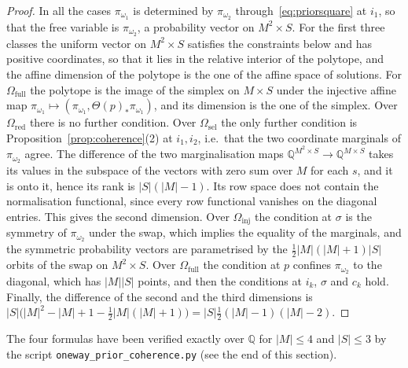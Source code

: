 \documentclass[11pt,a4paper]{article}
\theoremstyle{plain}
\theoremstyle{definition}
\theoremstyle{remark}
\newcommand{\cat}[1]{\mathsf{#1}}
\newcommand{\catO}{\cat{\Omega}}
\begin{document}
\begin{proof}
In all the cases $\pi_{\omega_1}$ is determined by $\pi_{\omega_2}$
through~\eqref{eq:priorsquare} at $i_1$, so that the free variable is
$\pi_{\omega_2}$, a probability vector on $M^{2}\times S$. For the first three
classes the uniform vector on $M^{2}\times S$ satisfies the constraints below
and has positive coordinates, so that it lies in the relative interior of
the polytope, and the affine dimension of the polytope is the one of the
affine space of solutions. For $\catO_{\mathrm{full}}$ the polytope is the
image of the simplex on $M\times S$ under the injective affine map
$\pi_{\omega_1} \mapsto (\pi_{\omega_1},\Theta(p)_{*}\pi_{\omega_1})$, and
its dimension is the one of the simplex. Over $\catO_{\mathrm{red}}$ there
is no further condition. Over
$\catO_{\mathrm{sel}}$ the only further condition is
Proposition~\ref{prop:coherence}(2) at $i_1,i_2$, i.e.\ that the two coordinate
marginals of $\pi_{\omega_2}$ agree. The difference of the two marginalisation
maps $\mathbb{Q}^{M^{2}\times S} \to \mathbb{Q}^{M\times S}$ takes its values
in the subspace of the vectors with zero sum over $M$ for each $s$, and it is
onto it, hence its rank is $|S|(|M|-1)$. Its row space does not contain the
normalisation functional, since every row functional vanishes on the diagonal
entries. This gives the second dimension. Over $\catO_{\mathrm{inj}}$ the
condition at $\sigma$ is the symmetry of $\pi_{\omega_2}$ under the swap,
which implies the equality of the marginals, and the symmetric probability
vectors are parametrised by the $\tfrac12|M|(|M|+1)|S|$ orbits of the swap on
$M^{2}\times S$. Over $\catO_{\mathrm{full}}$ the condition at $p$ confines
$\pi_{\omega_2}$ to the diagonal, which has $|M||S|$ points, and then the
conditions at $i_k$, $\sigma$ and $c_k$ hold. Finally, the difference of the
second and the third dimensions is
$|S|\bigl(|M|^{2}-|M|+1-\tfrac12|M|(|M|+1)\bigr) =
|S|\tfrac12(|M|-1)(|M|-2)$.
\end{proof}

The four formulas have been verified exactly over $\mathbb{Q}$ for $|M|\le 4$
and $|S|\le 3$ by the script
\texttt{oneway\_\allowbreak prior\_\allowbreak coherence.py} (see the end of
this section).
\end{document}
